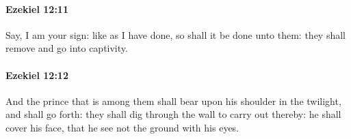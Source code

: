 		\paragraph{Ezekiel 12:11} %
			\label{EZEKIEL-12-11}

			Say, I am your sign: like as I have done, so shall it be done unto them: they shall remove and go into captivity.


		\paragraph{Ezekiel 12:12} %
			\label{EZEKIEL-12-12}

			And the prince that is among them shall bear upon his shoulder in the twilight, and shall go forth: they shall dig through the wall to carry out thereby: he shall cover his face, that he see not the ground with his eyes.


